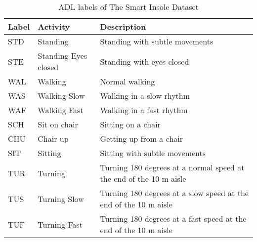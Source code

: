 \vspace{0.5cm} 

\begin{table} [h!]
    \centering
    \begin{tabular}{|>{\centering}m{2.5cm} |>{\centering}m{2.5cm} |>{\centering}m{6.5cm} |}
        \hline
         \textbf{Label}   &  \textbf{Activity}   &  \textbf{Description}  \tabularnewline
        \hline
        STD	& Standing	& Standing with subtle movements \tabularnewline
        \hline
        STE	& Standing Eyes closed & Standing with eyes closed \tabularnewline
        \hline
        WAL &	Walking &	Normal walking \tabularnewline
        \hline
        WAS	& Walking Slow	& Walking in a slow rhythm \tabularnewline
        \hline
        WAF	& Walking Fast	& Walking in a fast rhythm \tabularnewline
        \hline
        SCH	&Sit on chair &	Sitting on a chair \tabularnewline
        \hline
        CHU	& Chair up&	Getting up from a chair \tabularnewline
        \hline
        SIT	& Sitting	& Sitting with subtle movements \tabularnewline
        \hline
        TUR	&Turning&	Turning 180 degrees at a normal speed at the end of the 10 m aisle \tabularnewline
        \hline
        TUS	& Turning Slow	& Turning 180 degrees at a slow speed at the end of the 10 m aisle \tabularnewline
        \hline
        TUF	& Turning Fast&	Turning 180 degrees at a fast speed at the end of the 10 m aisle \tabularnewline
        \hline
    \end{tabular} 
    \caption{ADL labels of The Smart Insole Dataset}
    \label{tab:SmartInsoleADL}
\end{table}